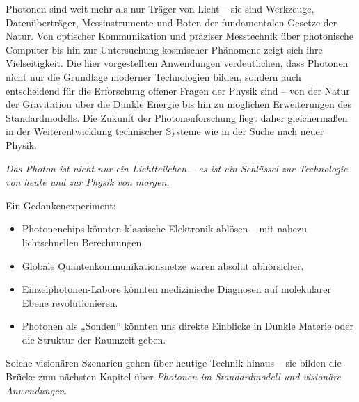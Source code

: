 Photonen sind weit mehr als nur Träger von Licht – sie sind Werkzeuge, Datenüberträger, Messinstrumente und Boten der fundamentalen Gesetze der Natur. 
Von optischer Kommunikation und präziser Messtechnik über photonische Computer bis hin zur Untersuchung kosmischer Phänomene zeigt sich ihre Vielseitigkeit. 
Die hier vorgestellten Anwendungen verdeutlichen, dass Photonen nicht nur die Grundlage moderner Technologien bilden, sondern auch entscheidend für die Erforschung offener Fragen der Physik sind – von der Natur der Gravitation über die Dunkle Energie bis hin zu möglichen Erweiterungen des Standardmodells. 
Die Zukunft der Photonenforschung liegt daher gleichermaßen in der Weiterentwicklung technischer Systeme wie in der Suche nach neuer Physik.

\medskip
\emph{Das Photon ist nicht nur ein Lichtteilchen – es ist ein Schlüssel zur Technologie von heute und zur Physik von morgen.}
\vspace{1em}
\begin{tcolorbox}[hypobox, title={Was wäre, wenn wir Photonen völlig kontrollieren könnten?}]
	\label{box:hypo_kapVII}
	Ein Gedankenexperiment: 
	\begin{itemize}
		\item Photonenchips könnten klassische Elektronik ablösen – mit nahezu lichtschnellen Berechnungen.
		\item Globale Quantenkommunikationsnetze wären absolut abhörsicher.
		\item Einzelphotonen-Labore könnten medizinische Diagnosen auf molekularer Ebene revolutionieren.
		\item Photonen als „Sonden“ könnten uns direkte Einblicke in Dunkle Materie oder die Struktur der Raumzeit geben.
	\end{itemize}
	\medskip
	Solche visionären Szenarien gehen über heutige Technik hinaus – sie bilden die Brücke zum nächsten Kapitel über \emph{Photonen im Standardmodell und visionäre Anwendungen}.
\end{tcolorbox}
